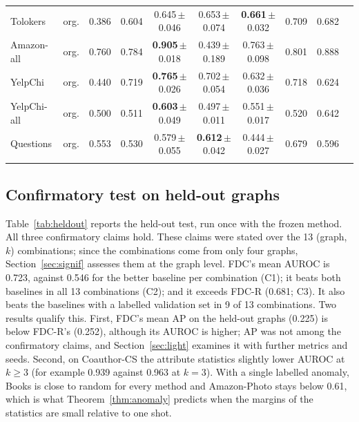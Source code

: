 \documentclass[pdflatex,sn-mathphys-ay]{sn-jnl}
\theoremstyle{plain}
\theoremstyle{remark}
\begin{document}
\begin{table}[!ht]
\begin{tabular*}{\textwidth}{@{\extracolsep{\fill}}llcccccccc@{}}
Tolokers & org. & 0.386 & 0.604 & 0.645\,{\tiny$\pm$0.046} & 0.653\,{\tiny$\pm$0.074} & \textbf{0.661}\,{\tiny$\pm$0.032} & 0.709 & 0.682 \\
Amazon-all & org. & 0.760 & 0.784 & \textbf{0.905}\,{\tiny$\pm$0.018} & 0.439\,{\tiny$\pm$0.189} & 0.763\,{\tiny$\pm$0.098} & 0.801 & 0.888 \\
YelpChi & org. & 0.440 & 0.719 & \textbf{0.765}\,{\tiny$\pm$0.026} & 0.702\,{\tiny$\pm$0.054} & 0.632\,{\tiny$\pm$0.036} & 0.718 & 0.624 \\
YelpChi-all & org. & 0.500 & 0.511 & \textbf{0.603}\,{\tiny$\pm$0.049} & 0.497\,{\tiny$\pm$0.011} & 0.551\,{\tiny$\pm$0.017} & 0.520 & 0.642 \\
Questions & org. & 0.553 & 0.530 & 0.579\,{\tiny$\pm$0.055} & \textbf{0.612}\,{\tiny$\pm$0.042} & 0.444\,{\tiny$\pm$0.027} & 0.679 & 0.596 \\
\botrule
\end{tabular*}
\end{table}

\subsection{Confirmatory test on held-out graphs}\label{sec:heldout}

Table~\ref{tab:heldout} reports the held-out test, run once with the frozen method. All three confirmatory claims hold. These claims were stated over the 13 (graph, $k$) combinations; since the combinations come from only four graphs, Section~\ref{sec:signif} assesses them at the graph level. FDC's mean AUROC is 0.723, against 0.546 for the better baseline per combination (C1); it beats both baselines in all 13 combinations (C2); and it exceeds FDC-R (0.681; C3). It also beats the baselines with a labelled validation set in 9 of 13 combinations. Two results qualify this. First, FDC's mean AP on the held-out graphs (0.225) is below FDC-R's (0.252), although its AUROC is higher; AP was not among the confirmatory claims, and Section~\ref{sec:light} examines it with further metrics and seeds. Second, on Coauthor-CS the attribute statistics slightly lower AUROC at $k\ge3$ (for example 0.939 against 0.963 at $k=3$). With a single labelled anomaly, Books is close to random for every method and Amazon-Photo stays below 0.61, which is what Theorem~\ref{thm:anomaly} predicts when the margins of the statistics are small relative to one shot.
\end{document}
